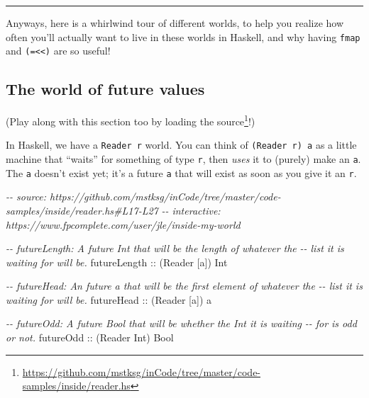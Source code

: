 \documentclass[]{article}
\newenvironment{Shaded}{}{}
\newcommand{\CommentTok}[1]{\textcolor[rgb]{0.38,0.63,0.69}{\textit{#1}}}
\newcommand{\DataTypeTok}[1]{\textcolor[rgb]{0.56,0.13,0.00}{#1}}
\newcommand{\NormalTok}[1]{#1}
\newcommand{\OtherTok}[1]{\textcolor[rgb]{0.00,0.44,0.13}{#1}}
\renewcommand{\href}[2]{#2\footnote{\url{#1}}}
\begin{document}
\begin{center}\rule{0.5\linewidth}{0.5pt}\end{center}

Anyways, here is a whirlwind tour of different worlds, to help you realize how
often you'll actually want to live in these worlds in Haskell, and why having
\texttt{fmap} and \texttt{(=\textless{}\textless{})} are so useful!

\subsection{The world of future values}\label{the-world-of-future-values}

(Play along with this section too by
\href{https://github.com/mstksg/inCode/tree/master/code-samples/inside/reader.hs}{loading
the source}!)

In Haskell, we have a \texttt{Reader\ r} world. You can think of
\texttt{(Reader\ r)\ a} as a little machine that ``waits'' for something of type
\texttt{r}, then \emph{uses} it to (purely) make an \texttt{a}. The \texttt{a}
doesn't exist yet; it's a future \texttt{a} that will exist as soon as you give
it an \texttt{r}.

\begin{Shaded}
\begin{Highlighting}[]
\CommentTok{{-}{-} source: https://github.com/mstksg/inCode/tree/master/code{-}samples/inside/reader.hs\#L17{-}L27}
\CommentTok{{-}{-} interactive: https://www.fpcomplete.com/user/jle/inside{-}my{-}world}

\CommentTok{{-}{-} futureLength: A future \textasciigrave{}Int\textasciigrave{} that will be the length of whatever the}
\CommentTok{{-}{-}      list it is waiting for will be.}
\OtherTok{futureLength ::}\NormalTok{ (}\DataTypeTok{Reader}\NormalTok{ [a]) }\DataTypeTok{Int}

\CommentTok{{-}{-} futureHead: An future \textasciigrave{}a\textasciigrave{} that will be the first element of whatever the}
\CommentTok{{-}{-}      list it is waiting for will be.}
\OtherTok{futureHead   ::}\NormalTok{ (}\DataTypeTok{Reader}\NormalTok{ [a]) a}

\CommentTok{{-}{-} futureOdd: A future \textasciigrave{}Bool\textasciigrave{} that will be whether the \textasciigrave{}Int\textasciigrave{} it is waiting}
\CommentTok{{-}{-}      for is odd or not.}
\OtherTok{futureOdd    ::}\NormalTok{ (}\DataTypeTok{Reader} \DataTypeTok{Int}\NormalTok{) }\DataTypeTok{Bool}
\end{Highlighting}
\end{Shaded}
\end{document}

